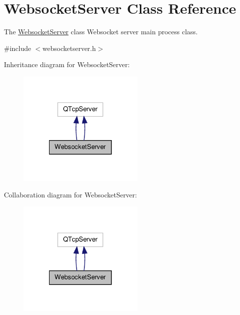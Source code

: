 \hypertarget{class_websocket_server}{\section{Websocket\-Server Class Reference}
\label{class_websocket_server}
}


The \hyperlink{class_websocket_server}{Websocket\-Server} class Websocket server main process class.  




{\ttfamily \#include $<$websocketserver.\-h$>$}



Inheritance diagram for Websocket\-Server\-:
\nopagebreak
\begin{figure}[H]
\begin{center}
\leavevmode
\includegraphics[width=174pt]{class_websocket_server__inherit__graph}
\end{center}
\end{figure}


Collaboration diagram for Websocket\-Server\-:
\nopagebreak
\begin{figure}[H]
\begin{center}
\leavevmode
\includegraphics[width=174pt]{class_websocket_server__coll__graph}
\end{center}
\end{figure}
